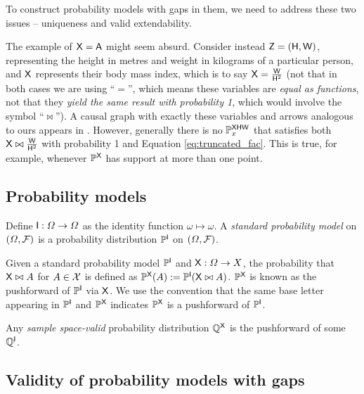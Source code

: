 To construct probability models with gaps in them, we need to address these two issues -- uniqueness and valid extendability.


The example of $\mathsf{X}=\mathsf{A}$ might seem absurd. Consider instead $\mathsf{Z}=(\mathsf{H},\mathsf{W})$, representing the height in metres and weight in kilograms of a particular person, and $\mathsf{X}$ represents their body mass index, which is to say $\mathsf{X}=\frac{\mathsf{W}}{\mathsf{H}^2}$ (not that in both cases we are using ``$=$'', which means these variables are \emph{equal as functions}, not that they \emph{yield the same result with probability 1}, which would involve the symbol ``$\bowtie$''). A causal graph with exactly these variables and arrows analogous to ours appears in \citet{shahar_association_2009}. However, generally there is no $\mathbb{P}_x^{\mathsf{XHW}}$ that satisfies both $\mathsf{X}\bowtie \frac{\mathsf{W}}{\mathsf{H}^2}$ with probability 1 and Equation \ref{eq:truncated_fac}. This is true, for example, whenever $\mathbb{P}^{\mathsf{X}}$ has support at more than one point.

\subsection{Probability models}

Define $\mathsf{I}:\Omega\to \Omega$ as the identity function $\omega\mapsto \omega$. A \emph{standard probability model} on $(\Omega,\mathcal{F})$ is a probability distribution $\mathbb{P}^{\mathsf{I}}$ on $(\Omega,\mathcal{F})$.

Given a standard probability model $\mathbb{P}^{\mathsf{I}}$ and $\mathsf{X}:\Omega\to X$, the probability that $\mathsf{X}\bowtie A$ for $A\in\mathcal{X}$ is defined as $\mathbb{P}^{\mathsf{X}}(A):=\mathbb{P}^{\mathsf{I}}(\mathsf{X}\bowtie A)$. $\mathbb{P}^{\mathsf{X}}$ is known as the pushforward of $\mathbb{P}^{\mathsf{I}}$ via $\mathsf{X}$. We use the convention that the same base letter appearing in $\mathbb{P}^{\mathsf{I}}$ and $\mathbb{P}^{\mathsf{X}}$ indicates $\mathbb{P}^{\mathsf{X}}$ is a pushforward of $\mathbb{P}^{\mathsf{I}}$. 

Any \emph{sample space-valid} probability distribution $\mathbb{Q}^{\mathsf{X}}$ is the pushforward of some $\mathbb{Q}^{\mathsf{I}}$.

\subsection{Validity of probability models with gaps}\label{sec:validity_of_gapprob}

